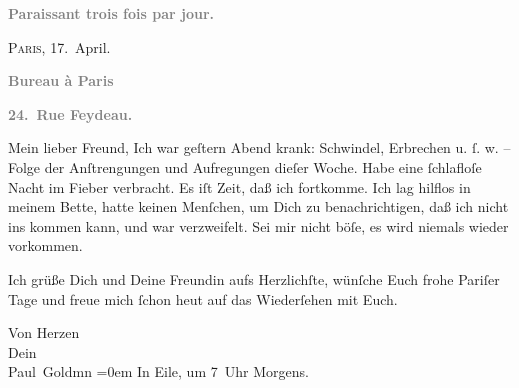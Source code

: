 \pstart
           \begin{otherlanguage}{french}\textcolor{gray}{\textbf{\textbf{Paraissant trois fois par jour.}}}\end{otherlanguage}\hfill \textsc{Paris}, 17. April.\pend
           
\pstart
           \begin{otherlanguage}{french}\textcolor{gray}{\textbf{\textbf{Bureau à Paris}}}\end{otherlanguage}\pend
           
\pstart
           \begin{otherlanguage}{french}\textcolor{gray}{\textbf{\textbf{24. Rue Feydeau.}}}\end{otherlanguage}\pend
           
\pstart\center{}Mein lieber Freund,\pend\vspace{0.5em}
\pstart
           Ich war geſtern{ }Abend krank: Schwindel, Erbrechen u.{ }ſ. w. – Folge der Anſtrengungen und
               Aufregungen dieſer Woche. Habe eine{ }ſchlafloſe Nacht im Fieber verbracht. Es iſt
               Zeit, daß ich fortkomme. Ich lag hilflos in meinem Bette, hatte keinen Menſchen, um
               Dich zu benachrichtigen, daß ich nicht ins \label{K_L02808-1v}\label{K_L02808-1} kommen kann, und
               war verzweifelt. Sei mir nicht böſe, es wird niemals wieder vorkommen.\pend
           
\pstart
           Ich grüße Dich und Deine {\pb}Freundin aufs Herzlichſte,
               wünſche Euch frohe Pariſer Tage und freue mich{ }ſchon heut auf das Wiederſehen mit Euch.\pend
           
\pstart
           Von Herzen {\\[\baselineskip]}Dein {\\[\baselineskip]}\spacefill\mbox{Paul Goldmn}\pend
           \leftskip=0em{}
\pstart
           \noindent{}In Eile, um 7 Uhr Morgens.\pend
           \endnumbering{}  \newcommand{\dateiname}{L02808}\newcommand{\titel}{Paul Goldmann an Arthur Schnitzler, 17. 4. [1897]}\newcommand{\editorInnen}{Martin Anton Müller und Laura Untner}
